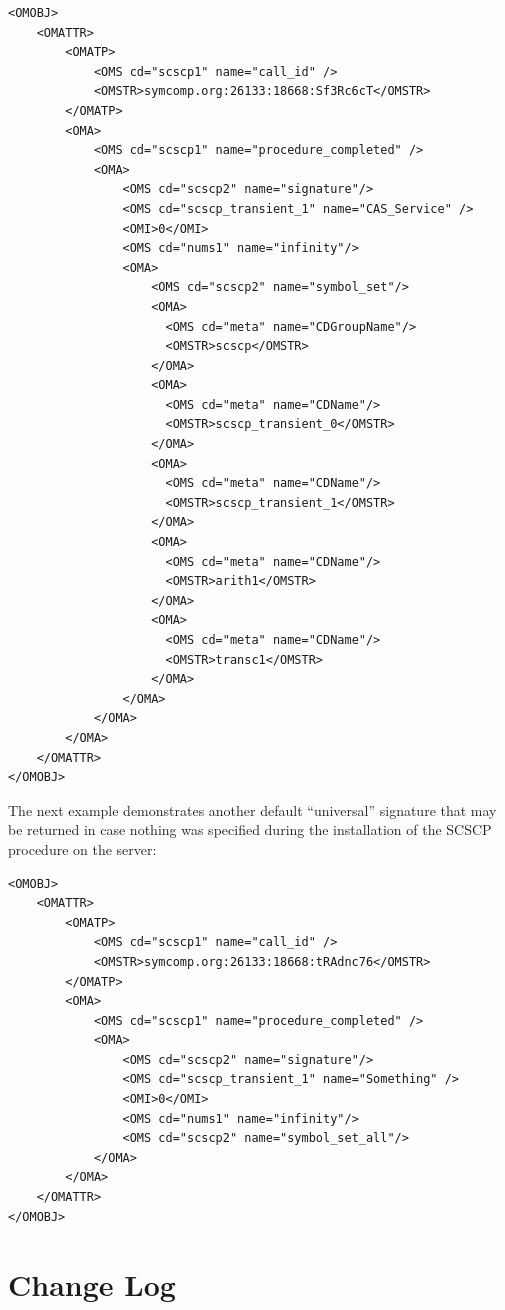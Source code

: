 \documentclass{amsart}
\begin{document}
\begin{verbatim}
<OMOBJ>
    <OMATTR>
        <OMATP>
            <OMS cd="scscp1" name="call_id" />
            <OMSTR>symcomp.org:26133:18668:Sf3Rc6cT</OMSTR>
        </OMATP>        
        <OMA>
            <OMS cd="scscp1" name="procedure_completed" />
            <OMA> 
                <OMS cd="scscp2" name="signature"/>
                <OMS cd="scscp_transient_1" name="CAS_Service" />
                <OMI>0</OMI>
                <OMS cd="nums1" name="infinity"/>
                <OMA>
                    <OMS cd="scscp2" name="symbol_set"/>    
                    <OMA>
                      <OMS cd="meta" name="CDGroupName"/>
                      <OMSTR>scscp</OMSTR>
                    </OMA>  
                    <OMA>
                      <OMS cd="meta" name="CDName"/>
                      <OMSTR>scscp_transient_0</OMSTR>
                    </OMA>                                      
                    <OMA>
                      <OMS cd="meta" name="CDName"/>
                      <OMSTR>scscp_transient_1</OMSTR>
                    </OMA>  
                    <OMA>
                      <OMS cd="meta" name="CDName"/>
                      <OMSTR>arith1</OMSTR>
                    </OMA> 
                    <OMA>
                      <OMS cd="meta" name="CDName"/>
                      <OMSTR>transc1</OMSTR>
                    </OMA>                                        
                </OMA>
            </OMA>    
        </OMA>
    </OMATTR>
</OMOBJ>
\end{verbatim}

The next example demonstrates another default ``universal'' signature that may be
returned in case nothing was specified during the installation of the
SCSCP procedure on the server:

\begin{verbatim}
<OMOBJ>
    <OMATTR>
        <OMATP>
            <OMS cd="scscp1" name="call_id" />
            <OMSTR>symcomp.org:26133:18668:tRAdnc76</OMSTR>
        </OMATP>        
        <OMA>
            <OMS cd="scscp1" name="procedure_completed" />
            <OMA> 
                <OMS cd="scscp2" name="signature"/>
                <OMS cd="scscp_transient_1" name="Something" />
                <OMI>0</OMI>
                <OMS cd="nums1" name="infinity"/>
                <OMS cd="scscp2" name="symbol_set_all"/>
            </OMA>    
        </OMA>
    </OMATTR>
</OMOBJ>
\end{verbatim}

\newpage
\section{Change Log}
\end{document}
